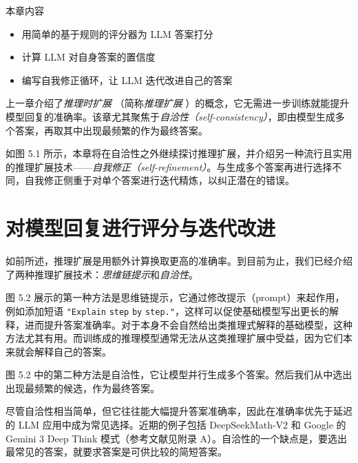 \begin{myChapterIntro}{本章内容}
\begin{itemize}
\item 用简单的基于规则的评分器为 LLM 答案打分
\item 计算 LLM 对自身答案的置信度
\item 编写自我修正循环，让 LLM 迭代改进自己的答案
\end{itemize}
\end{myChapterIntro}

上一章介绍了\emph{推理时扩展 }（简称\emph{推理扩展 }）的概念，它无需进一步训练就能提升模型回复的准确率。该章尤其聚焦于\emph{自洽性（self-consistency）}，即由模型生成多个答案，再取其中出现最频繁的作为最终答案。

如图 5.1 所示，本章将在自洽性之外继续探讨推理扩展，并介绍另一种流行且实用的推理扩展技术——\emph{自我修正（self-refinement）}。与生成多个答案再进行选择不同，自我修正侧重于对单个答案进行迭代精炼，以纠正潜在的错误。


\section{对模型回复进行评分与迭代改进}

如前所述，推理扩展是用额外计算换取更高的准确率。到目前为止，我们已经介绍了两种推理扩展技术：\emph{思维链提示}和\emph{自洽性}。

图 5.2 展示的第一种方法是思维链提示，它通过修改提示（prompt）来起作用，例如添加短语 \texttt{"}\texttt{Explain} \texttt{step} \texttt{by} \texttt{step.}\texttt{"}，这样可以促使基础模型写出更长的解释，进而提升答案准确率。对于本身不会自然给出类推理式解释的基础模型，这种方法尤其有用。而训练成的推理模型通常无法从这类推理扩展中受益，因为它们本来就会解释自己的答案。


图 5.2 中的第二种方法是自洽性，它让模型并行生成多个答案。然后我们从中选出出现最频繁的候选，作为最终答案。

尽管自洽性相当简单，但它往往能大幅提升答案准确率，因此在准确率优先于延迟的 LLM 应用中成为常见选择。近期的例子包括 DeepSeekMath-V2 和 Google 的 Gemini 3 Deep Think 模式（参考文献见附录 A）。自洽性的一个缺点是，要选出最常见的答案，就要求答案是可供比较的简短答案。

